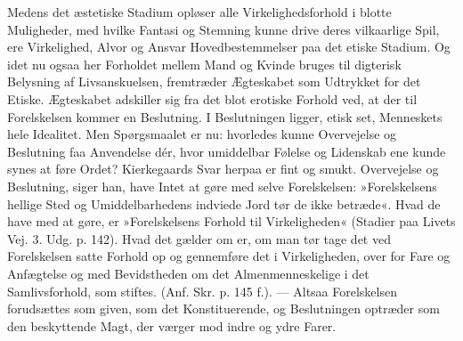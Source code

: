 \documentclass[12pt,a4paper,openany]{book}
\newcommand{\opage}[1]{\marginnote{\footnotesize\textit{[#1]}}}
\begin{document}
Medens det æstetiske Stadium opløser alle Virkelighedsforhold
i blotte Muligheder, med hvilke Fantasi og
Stemning kunne drive deres vilkaarlige Spil, ere Virkelighed,
Alvor og Ansvar Hovedbestemmelser paa det etiske
Stadium. Og idet nu ogsaa her Forholdet mellem Mand
og Kvinde bruges til digterisk Belysning af Livsanskuelsen,
fremtræder Ægteskabet som Udtrykket for det Etiske.
Ægteskabet adskiller sig fra det blot erotiske Forhold
ved, at der til Forelskelsen kommer en Beslutning. I
Beslutningen ligger, etisk set, Menneskets hele Idealitet.
Men Spørgsmaalet er nu: hvorledes kunne Overvejelse og
Beslutning faa Anvendelse dér, hvor umiddelbar Følelse
og Lidenskab ene kunde synes at føre Ordet? Kierkegaards
Svar herpaa er fint og smukt. Overvejelse og
Beslutning, siger han, have Intet at gøre med selve Forelskelsen:
»Forelskelsens hellige Sted og Umiddelbarhedens
indviede Jord tør de ikke betræde«. Hvad de have
med at gøre, er »Forelskelsens Forhold til Virkeligheden«
(Stadier paa Livets Vej. 3. Udg. p. 142). Hvad det gælder
om er, om man tør tage det ved Forelskelsen satte Forhold
op og gennemføre det i Virkeligheden, over for Fare
\opage{93}og Anfægtelse og med Bevidstheden om det Almenmenneskelige
i det Samlivsforhold, som stiftes. (Anf. Skr.
p. 145 f.). --- Altsaa Forelskelsen forudsættes som given,
som det Konstituerende, og Beslutningen optræder som
den beskyttende Magt, der værger mod indre og ydre
Farer.
\end{document}
